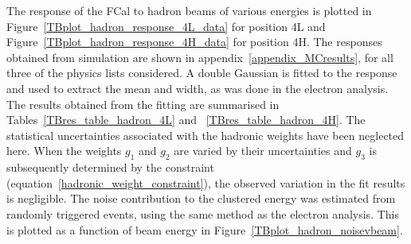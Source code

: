 
\vspace{0.3cm}

The response of the FCal to hadron beams of various energies is plotted in Figure~\ref{TBplot_hadron_response_4L_data} for position 4L and Figure~\ref{TBplot_hadron_response_4H_data} for position 4H. The responses obtained from simulation  are shown in appendix~\ref{appendix_MCresults}, for all three of the physics lists considered. A double Gaussian is fitted to the response and used to extract the mean and width, as was done in the electron analysis. The results obtained from the fitting are summarised in Tables~\ref{TBres_table_hadron_4L} and ~\ref{TBres_table_hadron_4H}. The statistical uncertainties associated with the hadronic weights have been neglected here. When the weights $g_1$ and $g_2$ are varied by their uncertainties and $g_3$ is subsequently determined by the constraint (equation~\ref{hadronic_weight_constraint}), the observed variation in the fit results is negligible. The noise contribution to the clustered energy was estimated from randomly triggered events, using the same method as the electron analysis. This is plotted as a function of beam energy in Figure~\ref{TBplot_hadron_noisevbeam}.

